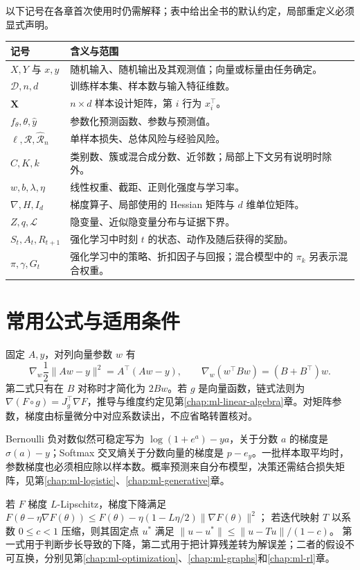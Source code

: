 \documentclass[UTF8,12pt,a4paper,fontset=fandol]{ctexbook}
\begin{document}
以下记号在各章首次使用时仍需解释；表中给出全书的默认约定，局部重定义必须显式声明。
\begin{longtable}{@{}L{3.2cm}L{10.8cm}@{}}
  \toprule
  记号 & 含义与范围 \\
  \midrule
  \endhead
  $X,Y$ 与 $x,y$ & 随机输入、随机输出及其观测值；向量或标量由任务确定。\\
  $\mathcal D,n,d$ & 训练样本集、样本数与输入特征维数。\\
  $\mathbf X$ & $n\times d$ 样本设计矩阵，第 $i$ 行为 $x_i^\top$。\\
  $f_\theta,\theta,\widehat y$ & 参数化预测函数、参数与预测值。\\
  $\ell,\mathcal R,\widehat{\mathcal R}_n$ & 单样本损失、总体风险与经验风险。\\
  $C,K,k$ & 类别数、簇或混合成分数、近邻数；局部上下文另有说明时除外。\\
  $w,b,\lambda,\eta$ & 线性权重、截距、正则化强度与学习率。\\
  $\nabla,H,I_d$ & 梯度算子、局部使用的 Hessian 矩阵与 $d$ 维单位矩阵。\\
  $Z,q,\mathcal L$ & 隐变量、近似隐变量分布与证据下界。\\
  $S_t,A_t,R_{t+1}$ & 强化学习中时刻 $t$ 的状态、动作及随后获得的奖励。\\
  $\pi,\gamma,G_t$ & 强化学习中的策略、折扣因子与回报；混合模型中的 $\pi_k$ 另表示混合权重。\\
  \bottomrule
\end{longtable}

\section{常用公式与适用条件}

固定 $A,y$，对列向量参数 $w$ 有
\[
 \nabla_w\frac12\|Aw-y\|^2=A^\top(Aw-y),\qquad
 \nabla_w(w^\top Bw)=(B+B^\top)w.
\]
第二式只有在 $B$ 对称时才简化为 $2Bw$。若 $g$ 是向量函数，链式法则为 $\nabla(F\circ g)=J_g^\top\nabla F$，推导与维度约定见第\ref{chap:ml-linear-algebra}章。对矩阵参数，梯度由标量微分中对应系数读出，不应省略转置核对。

Bernoulli 负对数似然可稳定写为 $\log(1+e^a)-ya$，关于分数 $a$ 的梯度是 $\sigma(a)-y$；Softmax 交叉熵关于分数向量的梯度是 $p-e_y$。一批样本取平均时，参数梯度也必须相应除以样本数。概率预测来自分布模型，决策还需结合损失矩阵，见第\ref{chap:ml-logistic}、\ref{chap:ml-generative}章。

若 $F$ 梯度 $L$-Lipschitz，梯度下降满足
$F(\theta-\eta\nabla F(\theta))\leq F(\theta)-\eta(1-L\eta/2)\|\nabla F(\theta)\|^2$；
若迭代映射 $T$ 以系数 $0\leq c<1$ 压缩，则其固定点 $u^*$ 满足
$\|u-u^*\|\leq\|u-Tu\|/(1-c)$。
第一式用于判断步长导致的下降，第二式用于把计算残差转为解误差；二者的假设不可互换，分别见第\ref{chap:ml-optimization}、\ref{chap:ml-graphs}和\ref{chap:ml-rl}章。
\end{document}
